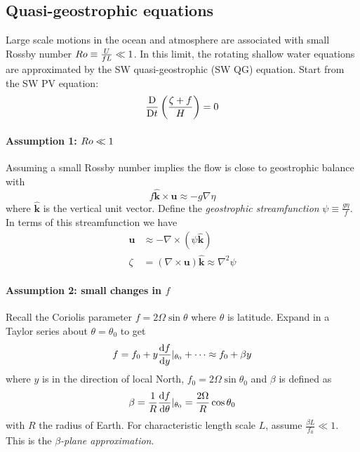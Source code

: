 \documentclass{jknotes}
\begin{document}
\subsection{Quasi-geostrophic equations}
Large scale motions in the ocean and atmosphere are associated with small
Rossby number $Ro \equiv \frac{U}{fL} \ll 1$. In this limit, the rotating
shallow water equations are approximated by the SW quasi-geostrophic (SW QG)
equation. Start from the SW PV equation:
\begin{equation}
	\frac{\mathrm{D}}{\mathrm{D} t}\left(\frac{\zeta + f}{H}\right) =
	0\label{eq:PVcons2}
\end{equation}

\paragraph{Assumption 1: $Ro \ll 1$}
Assuming a small Rossby number implies the flow is close to geostrophic
balance with
\begin{equation}
	f \symbf{\hat{k}} \times \symbf{u} \approx -g \nabla \eta
\end{equation}
where $\hat{\symbf{k}}$ is the vertical unit vector. Define the \emph{geostrophic
streamfunction} $\psi \equiv \frac{g \eta}{f}$. In terms of this
streamfunction we have
\begin{align}
	\symbf{u} &\approx - \nabla \times (\psi \hat{\symbf{k}}) \\
	\zeta &= (\nabla \times \symbf{u})\hat{\symbf{k}} \approx \nabla^2 \psi
\end{align}

\paragraph{Assumption 2: small changes in $f$}
Recall the Coriolis parameter $f = 2 \Omega \sin \theta$ where $\theta$ is
latitude. Expand in a Taylor series about $\theta = \theta_0$ to get
\begin{equation}
	f = f_0 + y \frac{\diffd f}{\diffd y}\vert_{\theta_0} + \dots \approx f_0
	+ \beta y
\end{equation}
where $y$ is in the direction of local North, $f_0 = 2\Omega \sin \theta_0$
and $\beta$ is defined as
\begin{equation}
	\beta = \frac{1}{R} \frac{\diffd f}{\diffd \theta}\vert_{\theta_0} =
\frac{2\Omega}{R} \cos \theta_0\end{equation}
with $R$ the radius of Earth. For characteristic length scale $L$, assume
$\frac{\beta L}{f_0} \ll 1$. This is the \emph{$\beta$-plane approximation}.
\end{document}
